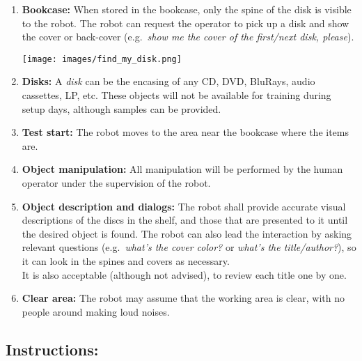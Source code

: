 \begin{enumerate}[nosep]
	\item \textbf{Bookcase:} When stored in the bookcase, only the spine of the disk is visible to the robot. The robot can request the operator to pick up a disk and show the cover or back-cover (e.g.~\textit{show me the cover of the first/next disk, please}).
	
		\begin{center}
	\texttt{[image: images/find\_my\_disk.png]}
	\end{center}
	
	\item \textbf{Disks:} A \textit{disk} can be the encasing of any CD, DVD, BluRays, audio cassettes, LP, etc. These objects will not be available for training during setup days, although samples can be provided.
	\item \textbf{Test start:} The robot moves to the area near the bookcase where the items are.
	
	\item \textbf{Object manipulation:} All manipulation will be performed by the human operator under the supervision of the robot.

	\item \textbf{Object description and dialogs:} The robot shall provide accurate visual descriptions of the discs in the shelf, and those that are presented to it until the desired object is found. The robot can also lead the interaction by asking relevant questions (e.g.~\textit{what's the cover color?} or \textit{what's the title/author?}), so it can look in the spines and covers as necessary.\\
	It is also acceptable (although not advised), to review each title one by one.

	\item \textbf{Clear area:} The robot may assume that the working area is clear, with no people around making loud noises.
	

\end{enumerate}

\subsection*{Instructions:}

